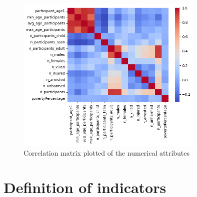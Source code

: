 \documentclass[10pt,a4paper]{report}
\begin{document}
\begin{figure}[h]
	\includegraphics[width=0.8\textwidth]{corr_matrix}
	\centering
	\caption{Correlation matrix plotted of the numerical attributes}
	\label{corr_matrix}
\end{figure}

\section{Definition of indicators}
\end{document}
